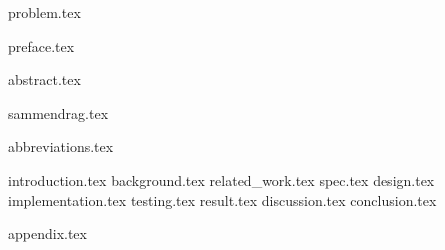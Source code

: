 \documentclass[pdftex,10pt,b5paper,twoside]{book}
\begin{document}
{problem.tex}

\setcounter{page}{1}
\setcounter{tocdepth}{3}

\let\cleardoublepage\clearpage
{preface.tex}

\let\cleardoublepage\clearpage
{abstract.tex}

\let\cleardoublepage\clearpage
{sammendrag.tex}

\let\cleardoublepage\clearpage
{abbreviations.tex}

\let\cleardoublepage\clearpage
\tableofcontents
{}

\let\cleardoublepage\clearpage
\listoffigures                                  
{}
\cleardoublepage


\listoftables                                   
{}
\cleardoublepage

\setcounter{page}{1}
\fancyhead[R]{\itshape \nouppercase \rightmark}
\pagestyle{fancy}

\let\cleardoublepage\clearpage
{introduction.tex}
\let\cleardoublepage\clearpage
{background.tex}
\let\cleardoublepage\clearpage
{related_work.tex}
\let\cleardoublepage\clearpage
{spec.tex}
\let\cleardoublepage\clearpage
{design.tex}
\let\cleardoublepage\clearpage
{implementation.tex}
\let\cleardoublepage\clearpage
{testing.tex}
\let\cleardoublepage\clearpage
{result.tex}
\let\cleardoublepage\clearpage
{discussion.tex}
\let\cleardoublepage\clearpage
{conclusion.tex}


\let\cleardoublepage\clearpage
\begin{appendices}
{appendix.tex}
\end{appendices}

\let\cleardoublepage\clearpage
\begin{sloppypar}
\printbibliography
\end{sloppypar}
\end{document}

